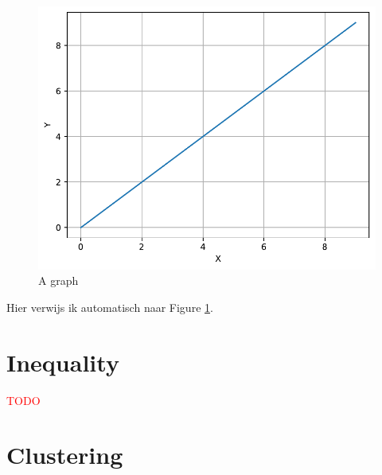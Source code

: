 \documentclass[10pt,a4paper]{article}
\newcommand{\todo}[1]{\textcolor{red}{#1}}
\begin{document}
\begin{multicols}{2}
\begin{figure}[H]
\centering
\includegraphics[scale=0.44]{figures/graph.pdf}
\caption{A graph}
\label{fig-agraph}
\end{figure}

Hier verwijs ik automatisch naar Figure \ref{fig-agraph}. \\
\section{Inequality}
\todo{TODO}
\section{Clustering}
\end{multicols}


\end{document}

